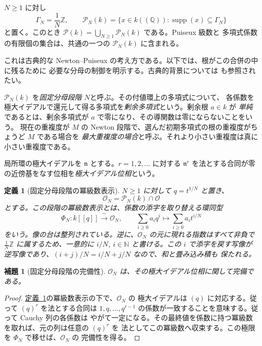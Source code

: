\documentclass[11pt,uplatex,dvipdfmx]{jsarticle}
\newcommand{\Puiseux}{\mathcal P(k)}
\newcommand{\Supp}{\operatorname{supp}}
\newcommand{\Ocal}{\mathcal O}
\newcommand{\namedref}[2]{\hyperref[#2]{#1~\ref*{#2}}}
\theoremstyle{proofnote}
\newtheorem{lemma}[theorem]{補題}
\newtheorem{definition}[theorem]{定義}
\begin{document}
\(N\ge1\) に対し
\[
  \Gamma_N=\frac1N\mathbb Z,\qquad
  \mathcal P_N(k)=
  \{x\in k((\mathbb Q)):\Supp(x)\subseteq\Gamma_N\}
\]
と置く。このとき \(\Puiseux=\bigcup_{N\ge1}\mathcal P_N(k)\) である。Puiseux 級数と
多項式係数の有限個の集合は、共通の一つの \(\mathcal P_N(k)\) に含まれる。

これは古典的な Newton--Puiseux の考え方である。以下では、根がこの合併の中に残るために
必要な分母の制御を明示する。古典的背景については \cite{Walker} も参照されたい。

\(\mathcal P_N(k)\) を\emph{固定分母段階 \(N\)}と呼ぶ。その付値環上の多項式について、
各係数を極大イデアルで還元して得る多項式を\emph{剰余多項式}という。剰余根 \(a\in k\) が
\emph{単純}であるとは、剰余多項式が \(a\) で零になり、その導関数は零にならないことをいう。
現在の重複度が
\(M\) の Newton 段階で、選んだ初期多項式の根の重複度がちょうど \(M\) である場合を
\emph{最大重複度の場合}と呼ぶ。それより小さい重複度は真に小さい重複度である。

局所環の極大イデアルを \(\mathfrak n\) とする。\(r=1,2,\ldots\) に対する
\(\mathfrak n^r\) を法とする合同が零の近傍基をなす位相を\emph{極大イデアル位相}という。

\begin{definition}[固定分母段階の冪級数表示]
\label{def:fixed-level-power-series}
  \(N\ge1\) に対して \(q=t^{1/N}\) と置き、
  \[
    \mathcal O_N=\mathcal P_N(k)\cap\Ocal
  \]
  とする。この段階の\emph{冪級数表示}とは、係数の添字を取り替える環同型
  \[
    \Phi_N:k[[q]]\xrightarrow{\ \sim\ }\mathcal O_N,
    \qquad
    \sum_{i\ge0}a_iq^i\longmapsto\sum_{i\ge0}a_it^{i/N}
  \]
  をいう。像の台は整列されている。逆に、\(\mathcal O_N\) の元に現れる指数はすべて非負で
  \(\frac1N\mathbb Z\) に属するため、一意的に \(i/N\), \(i\in\mathbb N\) と書ける。この
  \(i\) で添字を戻す写像が逆写像であり、\((i+j)/N=i/N+j/N\) なので、和と畳み込み積も
  保たれる。
\end{definition}

\begin{lemma}[固定分母段階の完備性]
\label{lem:fixed-level}
  \(\mathcal O_N\) は、その極大イデアル位相に関して完備である。
\end{lemma}
\begin{proof}
  \namedref{定義}{def:fixed-level-power-series}の冪級数表示の下で、\(\mathcal O_N\) の
  極大イデアルは \((q)\) に対応する。従って \((q)^r\) を法とする合同は
  \(1,q,\ldots,q^{r-1}\) の係数が一致することを意味する。従って Cauchy 列の各係数は
  やがて一定になる。その最終値を係数に持つ冪級数を取れば、元の列は任意の \((q)^r\) を
  法としてこの冪級数へ収束する。この極限を \(\Phi_N\) で移せば、\(\mathcal O_N\) の
  完備性を得る。
\end{proof}
\end{document}
